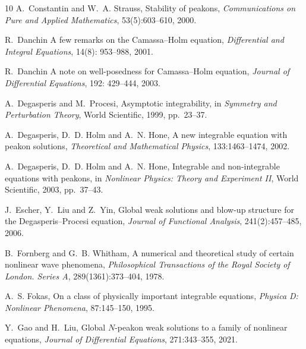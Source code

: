 \documentclass[11pt]{article}
\begin{document}
\begin{thebibliography}{10}
A.~Constantin and W.~A. Strauss,
\newblock Stability of peakons,
\newblock \emph{Communications on Pure and Applied Mathematics}, 53(5):603--610, 2000.

R.~Danchin
\newblock A few remarks on the Camassa–Holm equation,
\newblock \emph{Differential and Integral Equations}, 14(8): 953–988, 2001.

R.~Danchin
\newblock A note on well-posedness for Camassa–Holm equation,
\newblock \emph{Journal of Differential Equations}, 192: 429–444, 2003.



A.~Degasperis and M.~Procesi,
\newblock Asymptotic integrability,
\newblock in \emph{Symmetry and Perturbation Theory}, World Scientific, 1999, pp.~23--37.

A.~Degasperis, D.~D. Holm and A.~N. Hone,
\newblock A new integrable equation with peakon solutions,
\newblock \emph{Theoretical and Mathematical Physics}, 133:1463--1474, 2002.

A.~Degasperis, D.~D. Holm and A.~N. Hone,
\newblock Integrable and non-integrable equations with peakons,
\newblock in \emph{Nonlinear Physics: Theory and Experiment II}, World Scientific, 2003, pp.~37--43.

J.~Escher, Y.~Liu and Z.~Yin,
\newblock Global weak solutions and blow-up structure for the Degasperis--Procesi equation,
\newblock \emph{Journal of Functional Analysis}, 241(2):457--485, 2006.

B.~Fornberg and G.~B. Whitham,
\newblock A numerical and theoretical study of certain nonlinear wave phenomena,
\newblock \emph{Philosophical Transactions of the Royal Society of London. Series A}, 289(1361):373--404, 1978.

A.~S. Fokas,
\newblock On a class of physically important integrable equations,
\newblock \emph{Physica D: Nonlinear Phenomena}, 87:145--150, 1995. 


Y.~Gao and H.~Liu,
\newblock Global $N$-peakon weak solutions to a family of nonlinear equations,
\newblock \emph{Journal of Differential Equations}, 271:343--355, 2021.


\end{thebibliography}
\end{document}
